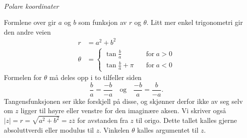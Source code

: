 \begin{center}
\\
{\small \textit{Polare koordinater}}
\end{center}
Formlene over gir $a$ og $b$ som funksjon av $r$ og $\theta$. Litt mer enkel trigonometri gir den andre veien
\begin{align*}
r&=a^2+b^2 \\
\theta&= \begin{cases} \tan \frac{b}{a} \quad &\text{for}\; a>0\\ \tan \frac{b}{a} + \pi \quad &\text{for}\;  a<0 \end{cases}
\end{align*}
Formelen for $\theta$ må deles opp i to tilfeller siden
\[
\frac{b}{a}=\frac{-b}{-a} \quad \text{og} \quad \frac{-b}{a}=\frac{b}{-a}.
\]
 Tangensfunksjonen ser ikke forskjell på disse, og skjønner derfor ikke av seg selv om $z$ ligger til høyre eller venstre for den imaginære aksen. Vi skriver også $|z|=r=\sqrt{a^2+b^2}=z\overline z$ for avstanden fra $z$ til origo. Dette tallet kalles gjerne absoluttverdi eller modulus til $z$. Vinkelen $\theta$ kalles argumentet til $z$.


